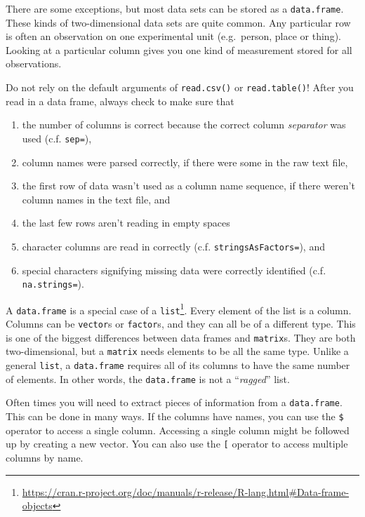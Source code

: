 \documentclass[
  12pt,
  krantz2]{krantz}
\providecommand{\tightlist}{%
  \setlength{\itemsep}{0pt}\setlength{\parskip}{0pt}}
\renewcommand{\href}[2]{#2\footnote{\url{#1}}}
\newenvironment{rmd-caution}{\begin{lrbox}{\rmdbox}
  \minipage[c]{\dimexpr \textwidth-2\fboxrule-\wd\excl-\columnsep}
    \vspace*{\columnsep}}%
{\vspace*{\columnsep}\endminipage\end{lrbox}%
  {\par\color{yellow}\fboxsep=0pt
    \fbox{\usebox\excl\usebox\rmdbox\hspace{\columnsep}}\par}}
\begin{document}
There are some exceptions, but most data sets can be stored as a \texttt{data.frame}. These kinds of two-dimensional data sets are quite common. Any particular row is often an observation on one experimental unit (e.g.~person, place or thing). Looking at a particular column gives you one kind of measurement stored for all observations.

\begin{rmd-caution}

Do not rely on the default arguments of \texttt{read.csv()} or \texttt{read.table()}! After you read in a data frame, always check to make sure that

\begin{enumerate}
\def\labelenumi{\arabic{enumi}.}
\tightlist
\item
  the number of columns is correct because the correct column \emph{separator} was used (c.f. \texttt{sep=}),
\item
  column names were parsed correctly, if there were some in the raw text file,
\item
  the first row of data wasn't used as a column name sequence, if there weren't column names in the text file, and
\item
  the last few rows aren't reading in empty spaces
\item
  character columns are read in correctly (c.f. \texttt{stringsAsFactors=}), and
\item
  special characters signifying missing data were correctly identified (c.f. \texttt{na.strings=}).
\end{enumerate}

\end{rmd-caution}

\href{https://cran.r-project.org/doc/manuals/r-release/R-lang.html\#Data-frame-objects}{A \texttt{data.frame} is a special case of a \texttt{list}}. Every element of the list is a column. Columns can be \texttt{vector}s or \texttt{factor}s, and they can all be of a different type. This is one of the biggest differences between data frames and \texttt{matrix}s. They are both two-dimensional, but a \texttt{matrix} needs elements to be all the same type. Unlike a general \texttt{list}, a \texttt{data.frame} requires all of its columns to have the same number of elements. In other words, the \texttt{data.frame} is not a ``\emph{ragged}'' list.

Often times you will need to extract pieces of information from a \texttt{data.frame}. This can be done in many ways. If the columns have names, you can use the \texttt{\$} operator to access a single column. Accessing a single column might be followed up by creating a new vector. You can also use the \texttt{{[}} operator to access multiple columns by name.
\end{document}
